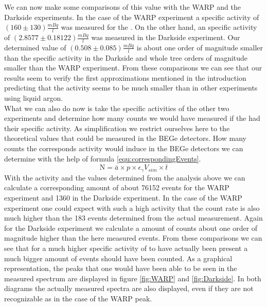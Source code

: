 \documentclass[encoding=utf8,british]{tumphthesis}
\begin{document}
We can now make some comparisons of this value with the WARP and the Darkside experiments.
In the case of the WARP experiment a specific activity of $(160\pm130)\frac{\unit{mBq}}{\unit{l}}$ \label{} was measured for the \Kr.
On the other hand, an specific activity of $(2.8577 \pm 0.18122) \frac{\unit{mBq}}{\unit{l}}$ was measured in the Darkside experiment.
Our determined value of $(0.508\pm0.085)\frac{\unit{mBq}}{\unit{l}}$ is about one order of magnitude smaller than the specific activity in the Darkside and whole tree orders of magnitude smaller than the WARP experiment.
From these comparisons we can see that our results seem to verify the first approximations mentioned in the introduction predicting that the \Kr activity seems to be much smaller than in other experiments using liquid argon.
\\

What we can also do now is take the specific activities of the other two experiments and determine how many counts we would have measured if the \Kr had their specific activity.
As simplification we restrict ourselves here to the theoretical values that could be measured in the BEGe detectors. 
How many counts the corresponds activity would induce in the BEGe detectors we can determine with the help of formula \ref{equ:correspondingEvents}.
\begin{equation}
\mathrm{N} = \bar{a} \times p \times \epsilon_\gamma V_{sim} \times \bar{t}
\label{equ:correspondingEvents}
\end{equation}
With the activity and the values determined from the analysis above we can calculate a corresponding amount of about 76152 events for the WARP experiment and 1360 in the Darkside experiment.
In the case of the WARP experiment one could expect with such a high activity that the count rate is also much higher than the 183 events determined from the actual measurement.
Again for the Darkside experiment we calculate a amount of counts about one order of magnitude higher than the here measured events.
From these comparisons we can see that for a much higher specific activity of \Kr to have actually been present a much bigger amount of events should have been counted.
As a graphical representation, the peaks that one would have been able to be seen in the measured spectrum are displayed in figure \ref{fig:WARP} and \ref{fig:Darkside}.
In both diagrams the actually measured spectra are also displayed, even if they are not recognizable as in the case of the WARP peak.
\\
\end{document}
